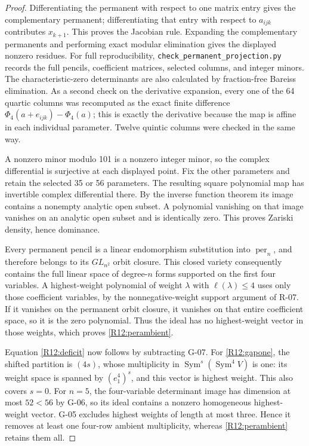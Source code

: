 \begin{proof}
Differentiating the permanent with respect to one matrix entry
gives the complementary permanent; differentiating that entry
with respect to $a_{ijk}$ contributes $x_{k+1}$. This proves the
Jacobian rule. Expanding the complementary permanents and
performing exact modular elimination gives the displayed
nonzero residues. For full reproducibility,
\texttt{check\_permanent\_projection.py} records the full pencils,
coefficient matrices, selected columns, and integer minors.
The characteristic-zero determinants are also calculated by
fraction-free Bareiss elimination. As a second check on the
derivative expansion, every one of the 64 quartic columns was
recomputed as the exact finite difference
$\Phi_4(a+e_{ijk})-\Phi_4(a)$; this is exactly the derivative
because the map is affine in each individual parameter.
Twelve quintic columns were checked in the same way.

A nonzero minor modulo 101 is a nonzero integer minor, so the
complex differential is surjective at each displayed point.
Fix the other parameters and retain the selected 35 or 56
parameters. The resulting square polynomial map has invertible
complex differential there. By the inverse function theorem its
image contains a nonempty analytic open subset. A polynomial
vanishing on that image vanishes on an analytic open subset and
is identically zero. This proves Zariski density, hence dominance.

Every permanent pencil is a linear endomorphism substitution
into $\operatorname{per}_n$, and therefore belongs to its
$GL_{n^2}$ orbit closure. This closed variety consequently
contains the full linear space of degree-$n$ forms supported on
the first four variables. A highest-weight polynomial of weight
$\lambda$ with $\ell(\lambda)\leq4$ uses only those coefficient
variables, by the nonnegative-weight support argument of R-07.
If it vanishes on the permanent orbit closure, it vanishes on
that entire coefficient space, so it is the zero polynomial.
Thus the ideal has no highest-weight vector in those weights,
which proves \eqref{R12:perambient}.

Equation \eqref{R12:deficit} now follows by subtracting G-07.
For \eqref{R12:gapone}, the shifted partition is $(4s)$, whose
multiplicity in $\operatorname{Sym}^s(\operatorname{Sym}^4V)$ is
one: its weight space is spanned by $(e_1^4)^s$, and this vector
is highest weight. This also covers $s=0$.
For $n=5$, the four-variable determinant image has dimension at
most $52<56$ by G-06, so its ideal contains a nonzero homogeneous
highest-weight vector. G-05 excludes highest weights of length
at most three. Hence it removes at least one four-row ambient
multiplicity, whereas \eqref{R12:perambient} retains them all.
\end{proof}

